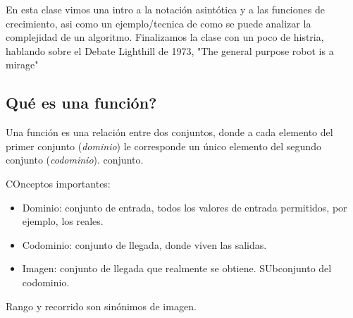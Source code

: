 \documentclass[11pt,letterpaper]{article}
\begin{document}
\newpage



\begin{quick_sum}
  En esta clase vimos una intro a la notación asintótica y a las funciones de crecimiento,
  asi como un ejemplo/tecnica de como se puede analizar la complejidad de un algoritmo.
  Finalizamos la clase con un poco de histria, hablando sobre el Debate Lighthill de 1973, "The general purpose robot is a mirage"
\end{quick_sum}

\subsection*{Qué es una función?}

\begin{definicion}
  Una función es una relación entre dos conjuntos, donde a cada elemento
  del primer conjunto (\emph{dominio}) le corresponde un único elemento del segundo
  conjunto (\emph{codominio}).
  conjunto.
\end{definicion}

COnceptos importantes:
\begin{itemize}
  \item Dominio: conjunto de entrada, todos los valores de entrada permitidos, por ejemplo, los reales.
  \item Codominio: conjunto de llegada, donde viven las salidas.
  \item Imagen: conjunto de llegada que realmente se obtiene. SUbconjunto del codominio.
\end{itemize}

\begin{ojo}
  Rango y recorrido son sinónimos de imagen.
\end{ojo}
\end{document}
